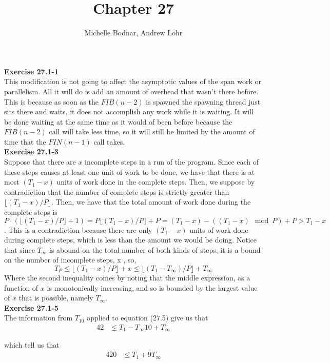 \documentclass{article}
\title{Chapter 27}
\author{Michelle Bodnar, Andrew Lohr}
\begin{document}
\maketitle
\noindent\textbf{Exercise 27.1-1}\\
This modification is not going to affect the asymptotic values of the span work or parallelism. All it will do is add an amount of overhead that wasn't there before. This is because as soon as the $FIB(n-2)$ is spawned the spawning thread just sits there and waits, it does not accomplish any work while it is waiting. It will be done waiting at the same time as it would of been before because the $FIB(n-2)$ call will take less time, so it will still be limited by the amount of time that the $FIN(n-1)$ call takes.\\

\noindent\textbf{Exercise 27.1-3}\\
Suppose that there are $x$ incomplete steps in a run of the program. Since each of these steps causes at least one unit of work to be done, we have that there is at most $(T_1-x)$ units of work done in the complete steps. Then, we suppose by contradiction that the number of complete steps is strictly greater than $\lfloor (T_1-x)/P\rfloor$. Then, we have that the total amount of work done during the complete steps is $P\cdot (\lfloor (T_1-x)/P\rfloor + 1) = P\lfloor (T_1-x)/P\rfloor +P =  (T_1-x) - ((T_1-x)\mod P) + P > T_1-x$. This is a contradiction because there are only $(T_1-x)$ units of work done during complete steps, which is less than the amount we would be doing. Notice that since $T_\infty$ is abound on the total number of both kinds of steps, it is a bound on the number of incomplete steps, x , so, 
\[
T_P \le \lfloor (T_1-x)/P\rfloor +x \le \lfloor (T_1-T_{\infty})/P\rfloor +T_{\infty} 
\]
Where the second inequality comes by noting that the middle expression, as a function of $x$ is monotonically increasing, and so is bounded by the largest value of $x$ that is possible, namely $T_{\infty}$.\\

\noindent\textbf{Exercise 27.1-5}\\
The information from $T_{10}$ applied to equation (27.5) give us that
\begin{align*}
42 &\le {T_1 - T_\infty}{10} + T_\infty
\end{align*}

which tell us that 
\begin{align*}
420 &\le T_1 +9 T_\infty
\end{align*}
\end{document}
